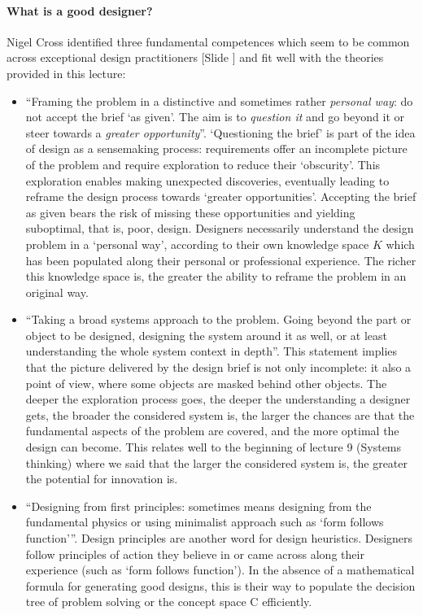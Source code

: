 \documentclass{article}
\newcounter{slide}
\begin{document}
\paragraph{What is a good designer?} Nigel Cross identified three fundamental competences which seem to be common across exceptional design practitioners {\color{blue}[Slide ]}\cite[reformulated by Elies Dekonkinck]{crossDesignThinkingUnderstanding2011a} and fit well with the theories provided in this lecture: 
\begin{itemize}
	\item ``Framing the problem in a distinctive and sometimes rather \emph{personal way}: do not accept the brief `as given'. The aim is to \emph{question it} and go beyond it or steer towards a \emph{greater opportunity}''. `Questioning the brief' is part of the idea of design as a sensemaking process: requirements offer an incomplete picture of the problem and require exploration to reduce their `obscurity'. This exploration enables making unexpected discoveries, eventually leading to reframe the design process towards `greater opportunities'. Accepting the brief as given bears the risk of missing these opportunities and yielding suboptimal, that is, poor, design. Designers necessarily understand the design problem in a `personal way', according to their own knowledge space $K$ which has been populated along their personal or professional experience. The richer this knowledge space is, the greater the ability to reframe the problem in an original way.
	\item ``Taking a broad systems approach to the problem. Going beyond the part or object to be designed, designing the system around it as well, or at least understanding the whole system context in depth''. This statement implies that the picture delivered by the design brief is not only incomplete: it also a point of view, where some objects are masked behind other objects. The deeper the exploration process goes, the deeper the understanding a designer gets, the broader the considered system is, the larger the chances are that the fundamental aspects of the problem are covered, and the more optimal the design can become. This relates well to the beginning of lecture 9 (Systems thinking) where we said that the larger the considered system is, the greater the potential for innovation is. 
	\item ``Designing from first principles: sometimes means designing from the fundamental physics or using minimalist approach such as `form follows function'''. Design principles are another word for design heuristics. Designers follow principles of action they believe in or came across along their experience (such as `form follows function'). In the absence of a mathematical formula for generating good designs, this is their way to populate the decision tree of problem solving or the concept space C efficiently. 
\end{itemize}
\end{document}
